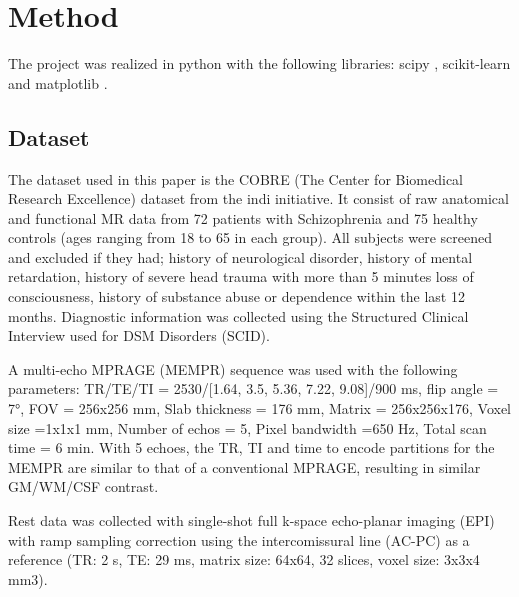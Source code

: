 \documentclass[12pt,journal,compsoc]{IEEEtran}
\begin{document}


\section{Method}
The project was realized in python with the following libraries: scipy \cite{scipy}, scikit-learn \cite{scikitlearn} and matplotlib \cite{matplotlib}.

\subsection{Dataset}
The dataset used in this paper is the COBRE (The Center for Biomedical Research Excellence) dataset from the indi initiative. It consist of raw anatomical and functional MR data from 72 patients with Schizophrenia and 75 healthy controls (ages ranging from 18 to 65 in each group). All subjects were screened and excluded if they had; history of neurological disorder, history of mental retardation, history of severe head trauma with more than 5 minutes loss of consciousness, history of substance abuse or dependence within the last 12 months. Diagnostic information was collected using the Structured Clinical Interview used for DSM Disorders (SCID).

A multi-echo MPRAGE (MEMPR) sequence was used with the following parameters: TR/TE/TI = 2530/[1.64, 3.5, 5.36, 7.22, 9.08]/900 ms, flip angle = 7°, FOV = 256x256 mm, Slab thickness = 176 mm, Matrix = 256x256x176, Voxel size =1x1x1 mm, Number of echos = 5, Pixel bandwidth =650 Hz, Total scan time = 6 min. With 5 echoes, the TR, TI and time to encode partitions for the MEMPR are similar to that of a conventional MPRAGE, resulting in similar GM/WM/CSF contrast.

Rest data was collected with single-shot full k-space echo-planar imaging (EPI) with ramp sampling correction using the intercomissural line (AC-PC) as a reference (TR: 2 s, TE: 29 ms, matrix size: 64x64, 32 slices, voxel size: 3x3x4 mm3).
\end{document}
